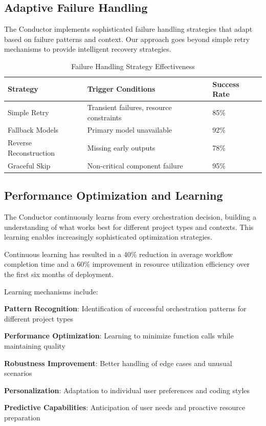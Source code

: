 \subsection*{Adaptive Failure Handling}

The Conductor implements sophisticated failure handling strategies that adapt based on failure patterns and context. Our approach goes beyond simple retry mechanisms to provide intelligent recovery strategies.

\begin{table}[ht]
\centering
\begin{tabular}{@{}lll@{}}
\toprule
\textbf{Strategy} & \textbf{Trigger Conditions} & \textbf{Success Rate} \\
\midrule
Simple Retry & Transient failures, resource constraints & 85\% \\
Fallback Models & Primary model unavailable & 92\% \\
Reverse Reconstruction & Missing early outputs & 78\% \\
Graceful Skip & Non-critical component failure & 95\% \\
\bottomrule
\end{tabular}
\caption{Failure Handling Strategy Effectiveness}
\end{table}

\subsection*{Performance Optimization and Learning}

The Conductor continuously learns from every orchestration decision, building a understanding of what works best for different project types and contexts. This learning enables increasingly sophisticated optimization strategies.

\begin{successbox}
Continuous learning has resulted in a 40\% reduction in average workflow completion time and a 60\% improvement in resource utilization efficiency over the first six months of deployment.
\end{successbox}

Learning mechanisms include:

\begin{expandedlist}
    \item \textbf{Pattern Recognition}: Identification of successful orchestration patterns for different project types
    \item \textbf{Performance Optimization}: Learning to minimize function calls while maintaining quality
    \item \textbf{Robustness Improvement}: Better handling of edge cases and unusual scenarios
    \item \textbf{Personalization}: Adaptation to individual user preferences and coding styles
    \item \textbf{Predictive Capabilities}: Anticipation of user needs and proactive resource preparation
\end{expandedlist}

